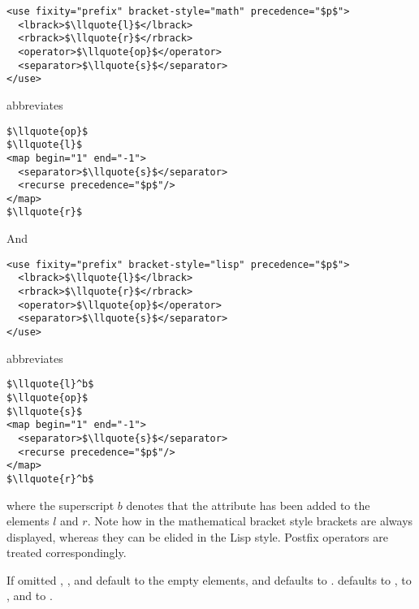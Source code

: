 \begin{minipage}{.53\textwidth}
\begin{lstlisting}[mathescape,frame=tlrb,numbers=none]
<use fixity="prefix" bracket-style="math" precedence="$p$">
  <lbrack>$\llquote{l}$</lbrack>
  <rbrack>$\llquote{r}$</rbrack>
  <operator>$\llquote{op}$</operator>
  <separator>$\llquote{s}$</separator>
</use>
\end{lstlisting}
\end{minipage}
\quad abbreviates\quad
\begin{minipage}{.28\textwidth}
\begin{lstlisting}[mathescape,frame=tlrb,numbers=none]
$\llquote{op}$
$\llquote{l}$
<map begin="1" end="-1">
  <separator>$\llquote{s}$</separator>
  <recurse precedence="$p$"/>
</map>
$\llquote{r}$
\end{lstlisting}
\end{minipage}

And

\begin{minipage}{.53\textwidth}
\begin{lstlisting}[mathescape,frame=tlrb,numbers=none]
<use fixity="prefix" bracket-style="lisp" precedence="$p$">
  <lbrack>$\llquote{l}$</lbrack>
  <rbrack>$\llquote{r}$</rbrack>
  <operator>$\llquote{op}$</operator>
  <separator>$\llquote{s}$</separator>
</use>
\end{lstlisting}
\end{minipage}
\quad abbreviates\quad
\begin{minipage}{.28\textwidth}
\begin{lstlisting}[mathescape,frame=tlrb,numbers=none]
$\llquote{l}^b$
$\llquote{op}$
$\llquote{s}$
<map begin="1" end="-1">
  <separator>$\llquote{s}$</separator>
  <recurse precedence="$p$"/>
</map>
$\llquote{r}^b$
\end{lstlisting}
\end{minipage}
where the superscript $b$ denotes that the attribute 
has been added to the elements $l$ and $r$. Note how in the mathematical bracket
style brackets are always displayed, whereas they can be elided in the Lisp
style. Postfix operators are treated
correspondingly.

If omitted {}, {}, and {} default to
the empty elements, and
{} defaults to . {}
defaults to {}, {} to
{}, and {} to
{}.

